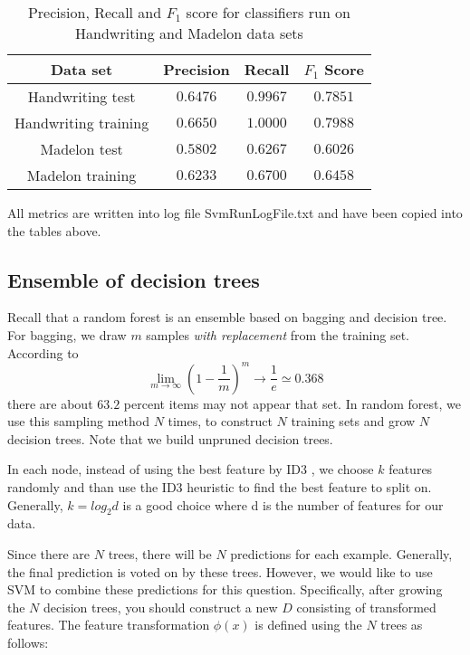 \begin{enumerate}
    \begin{table}[H]
    \centering
    \begin{tabular}{| c | c | c | c |}
      \hline
      Data set & Precision & Recall & $F_1$ Score  \\
      \hline
      Handwriting test& $0.6476$& $0.9967$& $0.7851$\\
      \hline
      Handwriting training& $0.6650$& $1.0000$& $0.7988$\\
      \hline
      Madelon test& $0.5802$& $0.6267$& $0.6026$\\
      \hline
      Madelon training& $0.6233$& $0.6700$& $0.6458$\\
      \hline
    \end{tabular}
    \caption{Precision, Recall and $F_1$ score for classifiers run on Handwriting and Madelon data sets}
  \end{table}   
\end{enumerate}

All metrics are written into log file SvmRunLogFile.txt and have been copied into the tables above.

\subsection{Ensemble of decision trees}

Recall that a random forest is an ensemble based on bagging and
decision tree. For bagging, we draw $m$ samples {\em with replacement}
from the training set. According to
$$\lim_{m \to \infty}(1-\frac{1}{m})^m \to \frac{1}{e} \simeq 0.368$$
there are about $63.2 $ percent items may not appear that set. In
random forest, we use this sampling method $N$ times, to construct $N$
training sets and grow $N$ decision trees. Note that we build unpruned
decision trees.

In each node, instead of using the best feature by ID3 , we choose $k$
features randomly and than use the ID3 heuristic to find the best
feature to split on. Generally, $k = log_2 d $ is a good choice where d
is the number of features for our data.

Since there are $N$ trees, there will be $N$ predictions for each
example. Generally, the final prediction is voted on by these trees.
However, we would like to use SVM to combine these predictions for
this question. Specifically, after growing the $N$ decision trees, you
should construct a new $D$ consisting of transformed features. The
feature transformation $\phi(x)$ is defined using the $N$ trees as
follows:

